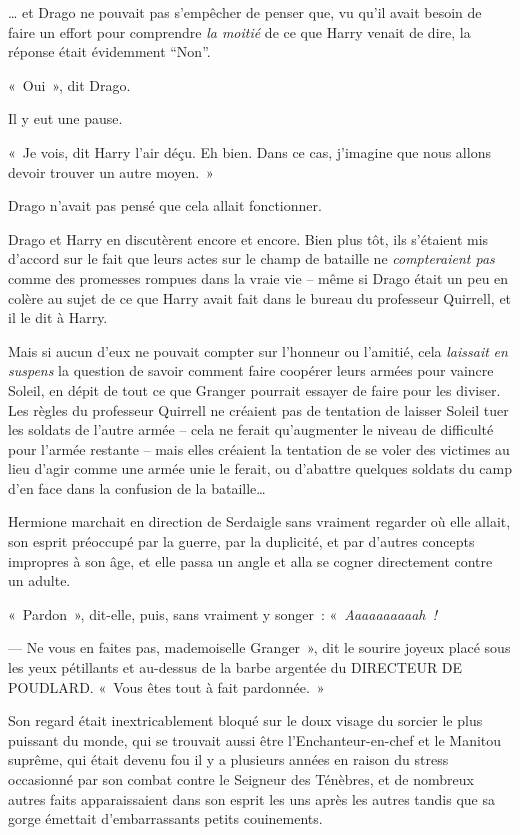 … et Drago ne pouvait pas s'empêcher de penser que, vu qu'il avait besoin de faire un effort pour comprendre \emph{la moitié} de ce que Harry venait de dire, la réponse était évidemment “Non”.

«~Oui~», dit Drago.

Il y eut une pause.

«~Je vois, dit Harry l'air déçu. Eh bien. Dans ce cas, j'imagine que nous allons devoir trouver un autre moyen.~»

Drago n'avait pas pensé que cela allait fonctionner.

Drago et Harry en discutèrent encore et encore. Bien plus tôt, ils s'étaient mis d'accord sur le fait que leurs actes sur le champ de bataille ne \emph{compteraient pas} comme des promesses rompues dans la vraie vie -- même si Drago était un peu en colère au sujet de ce que Harry avait fait dans le bureau du professeur Quirrell, et il le dit à Harry.

Mais si aucun d'eux ne pouvait compter sur l'honneur ou l'amitié, cela \emph{laissait} \emph{en suspens} la question de savoir comment faire coopérer leurs armées pour vaincre Soleil, en dépit de tout ce que Granger pourrait essayer de faire pour les diviser. Les règles du professeur Quirrell ne créaient pas de tentation de laisser Soleil tuer les soldats de l'autre armée -- cela ne ferait qu'augmenter le niveau de difficulté pour l'armée restante -- mais elles créaient la tentation de se voler des victimes au lieu d'agir comme une armée unie le ferait, ou d'abattre quelques soldats du camp d'en face dans la confusion de la bataille…

\later

Hermione marchait en direction de Serdaigle sans vraiment regarder où elle allait, son esprit préoccupé par la guerre, par la duplicité, et par d'autres concepts impropres à son âge, et elle passa un angle et alla se cogner directement contre un adulte.

«~Pardon~», dit-elle, puis, sans vraiment y songer~: «~\emph{Aaaaaaaaaah~!}

--- Ne vous en faites pas, mademoiselle Granger~», dit le sourire joyeux placé sous les yeux pétillants et au-dessus de la barbe argentée du DIRECTEUR DE POUDLARD. «~Vous êtes tout à fait pardonnée.~»

Son regard était inextricablement bloqué sur le doux visage du sorcier le plus puissant du monde, qui se trouvait aussi être l'Enchanteur-en-chef et le Manitou suprême, qui était devenu fou il y a plusieurs années en raison du stress occasionné par son combat contre le Seigneur des Ténèbres, et de nombreux autres faits apparaissaient dans son esprit les uns après les autres tandis que sa gorge émettait d'embarrassants petits couinements.

